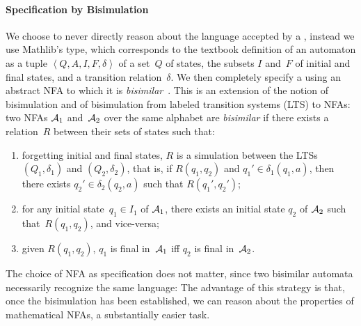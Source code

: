 \paragraph{Specification by Bisimulation}

We choose to never directly reason about the language accepted by a
, instead we use Mathlib's \citep{mathlib}  type, which
corresponds to the textbook definition of an automaton as a tuple $\left<Q, A,
I, F, \delta\right>$ of a set~$Q$ of states, the subsets $I$ and~$F$ of initial
and final states, and a transition relation~$\delta$.
%
We then completely specify a  using an abstract NFA to
which it is \emph{bisimilar}~\cite{kozen-automata-and-computability}.
%
This is an extension of the notion of bisimulation and of bisimulation from
labeled transition systems (LTS) to NFAs: two NFAs $\mathcal{A}_1$ and~$\mathcal{A}_2$ over
the same alphabet are \emph{bisimilar} if there exists a relation~$R$ between
their sets of states such that:
\begin{enumerate}
  \item forgetting initial and final states, $R$ is a simulation between the
    LTSs $(Q_1, \delta_1)$ and $(Q_2, \delta_2)$, that is, if $R(q_1, q_2)$ and
    $q_1' \in \delta_1(q_1, a)$, then there exists $q_2' \in \delta_2(q_2, a)$
    such that $R(q_1', q_2')$;
  \item for any initial state~$q_1 \in I_1$ of $\mathcal{A}_1$, there exists an initial
    state $q_2$ of $\mathcal{A}_2$ such that~$R(q_1, q_2)$, and vice-versa;
  \item given $R(q_1, q_2)$, $q_1$ is final in~$\mathcal{A}_1$ iff $q_2$ is final in~$\mathcal{A}_2$.
\end{enumerate}

The choice of NFA as specification does not matter, since two bisimilar
automata necessarily recognize the same language:
%
The advantage of this strategy is that, once the bisimulation has been
established, we can reason about the properties of mathematical NFAs, a
substantially easier task.

